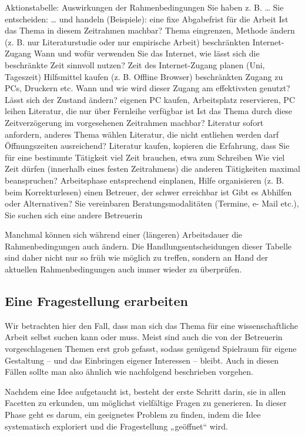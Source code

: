 \documentclass[]{article}
\begin{document}
Aktionstabelle: Auswirkungen der Rahmenbedingungen Sie haben z. B.
\ldots{} Sie entscheiden: \ldots{} und handeln (Beispiele): eine fixe
Abgabefrist für die Arbeit Ist das Thema in diesem Zeitrahmen machbar?
Thema eingrenzen, Methode ändern (z. B. nur Literaturstudie oder nur
empirische Arbeit) beschränkten Internet- Zugang Wann und wofür
verwenden Sie das Internet, wie lässt sich die beschränkte Zeit sinnvoll
nutzen? Zeit des Internet-Zugang planen (Uni, Tageszeit) Hilfsmittel
kaufen (z. B. Offline Browser) beschränkten Zugang zu PCs, Druckern etc.
Wann und wie wird dieser Zugang am effektivsten genutzt? Lässt sich der
Zustand ändern? eigenen PC kaufen, Arbeitsplatz reservieren, PC leihen
Literatur, die nur über Fernleihe verfügbar ist Ist das Thema durch
diese Zeitverzögerung im vorgesehenen Zeitrahmen machbar? Literatur
sofort anfordern, anderes Thema wählen Literatur, die nicht entliehen
werden darf Öffnungszeiten ausreichend? Literatur kaufen, kopieren die
Erfahrung, dass Sie für eine bestimmte Tätigkeit viel Zeit brauchen,
etwa zum Schreiben Wie viel Zeit dürfen (innerhalb eines festen
Zeitrahmens) die anderen Tätigkeiten maximal beanspruchen? Arbeitsphase
entsprechend einplanen, Hilfe organisieren (z. B. beim Korrekturlesen)
einen Betreuer, der schwer erreichbar ist Gibt es Abhilfen oder
Alternativen? Sie vereinbaren Beratungsmodalitäten (Termine, e- Mail
etc.), Sie suchen sich eine andere Betreuerin

Manchmal können sich während einer (längeren) Arbeitsdauer die
Rahmenbedingungen auch ändern. Die Handlungsentscheidungen dieser
Tabelle sind daher nicht nur so früh wie möglich zu treffen, sondern an
Hand der aktuellen Rahmenbedingungen auch immer wieder zu überprüfen.

\subsection{Eine Fragestellung
erarbeiten}\label{eine-fragestellung-erarbeiten}

Wir betrachten hier den Fall, dass man sich das Thema für eine
wissenschaftliche Arbeit selbst suchen kann oder muss. Meist sind auch
die von der Betreuerin vorgeschlagenen Themen erst grob gefasst, sodass
genügend Spielraum für eigene Gestaltung -- und das Einbringen eigener
Interessen -- bleibt. Auch in diesen Fällen sollte man also ähnlich wie
nachfolgend beschrieben vorgehen.

Nachdem eine Idee aufgetaucht ist, besteht der erste Schritt darin, sie
in allen Facetten zu erkunden, um möglichst vielfältige Fragen zu
generieren. In dieser Phase geht es darum, ein geeignetes Problem zu
finden, indem die Idee systematisch exploriert und die Fragestellung
„geöffnet`` wird.
\end{document}
